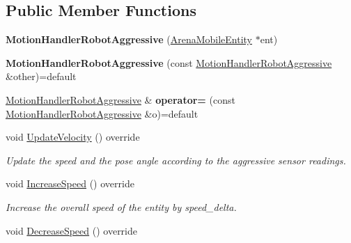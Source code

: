 \subsection*{Public Member Functions}
\begin{DoxyCompactItemize}
\item 
{\bfseries Motion\+Handler\+Robot\+Aggressive} (\hyperlink{class_arena_mobile_entity}{Arena\+Mobile\+Entity} $\ast$ent)\hypertarget{class_motion_handler_robot_aggressive_acf648d0f2f208acae95758437a426299}{}\label{class_motion_handler_robot_aggressive_acf648d0f2f208acae95758437a426299}

\item 
{\bfseries Motion\+Handler\+Robot\+Aggressive} (const \hyperlink{class_motion_handler_robot_aggressive}{Motion\+Handler\+Robot\+Aggressive} \&other)=default\hypertarget{class_motion_handler_robot_aggressive_a044bb32eea5f808939acd90964b4e1c4}{}\label{class_motion_handler_robot_aggressive_a044bb32eea5f808939acd90964b4e1c4}

\item 
\hyperlink{class_motion_handler_robot_aggressive}{Motion\+Handler\+Robot\+Aggressive} \& {\bfseries operator=} (const \hyperlink{class_motion_handler_robot_aggressive}{Motion\+Handler\+Robot\+Aggressive} \&o)=default\hypertarget{class_motion_handler_robot_aggressive_a7fc4c7bc46c31da2cd51b3cbce16d1d9}{}\label{class_motion_handler_robot_aggressive_a7fc4c7bc46c31da2cd51b3cbce16d1d9}

\item 
void \hyperlink{class_motion_handler_robot_aggressive_ac8bee64034c5fbf46dfce6de36b61dbe}{Update\+Velocity} () override\hypertarget{class_motion_handler_robot_aggressive_ac8bee64034c5fbf46dfce6de36b61dbe}{}\label{class_motion_handler_robot_aggressive_ac8bee64034c5fbf46dfce6de36b61dbe}

\begin{DoxyCompactList}\small\item\em Update the speed and the pose angle according to the aggressive sensor readings. \end{DoxyCompactList}\item 
void \hyperlink{class_motion_handler_robot_aggressive_afb955c958c2b1670e023cf7b6587cce6}{Increase\+Speed} () override\hypertarget{class_motion_handler_robot_aggressive_afb955c958c2b1670e023cf7b6587cce6}{}\label{class_motion_handler_robot_aggressive_afb955c958c2b1670e023cf7b6587cce6}

\begin{DoxyCompactList}\small\item\em Increase the overall speed of the entity by speed\+\_\+delta. \end{DoxyCompactList}\item 
void \hyperlink{class_motion_handler_robot_aggressive_a3f356f4caa6bdbed06c951f27a5cad76}{Decrease\+Speed} () override\hypertarget{class_motion_handler_robot_aggressive_a3f356f4caa6bdbed06c951f27a5cad76}{}\label{class_motion_handler_robot_aggressive_a3f356f4caa6bdbed06c951f27a5cad76}


\end{DoxyCompactItemize}
